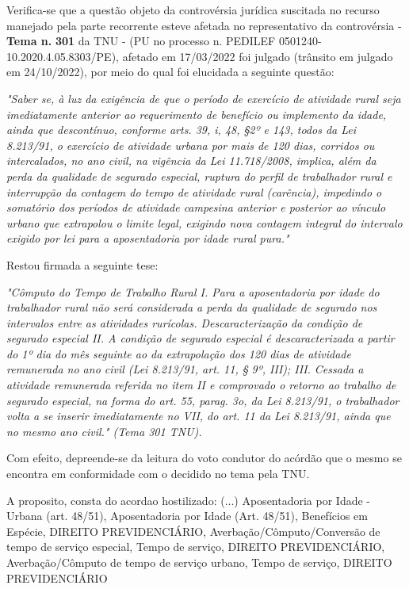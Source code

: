 \documentclass[12pt]{article}
\begin{document}
\justifying
\noindent Verifica-se que a questão objeto da controvérsia jurídica suscitada no recurso manejado pela parte recorrente esteve afetada no representativo da controvérsia - \textbf{Tema n. }\textbf{301} da TNU - (PU no processo n. PEDILEF 0501240-10.2020.4.05.8303/PE),  afetado em 17/03/2022 foi julgado (trânsito em julgado em 24/10/2022), por meio do qual foi elucidada a seguinte questão:

\noindent \textit{"Saber se, à luz da exigência de que o período de exercício de atividade rural seja imediatamente anterior ao requerimento de benefício ou implemento da idade, ainda que descontínuo, conforme arts. 39, i, 48, §2º e 143, todos da Lei 8.213/91, o exercício de atividade urbana por mais de 120 dias, corridos ou intercalados, no ano civil, na vigência da Lei 11.718/2008, implica, além da perda da qualidade de segurado especial, ruptura do perfil de trabalhador rural e interrupção da contagem do tempo de atividade rural (carência), impedindo o somatório dos períodos de atividade campesina anterior e posterior ao vínculo urbano que extrapolou o limite legal, exigindo nova contagem integral do intervalo exigido por lei para a aposentadoria por idade rural pura."}

\noindent Restou firmada a seguinte tese:

\noindent \textit{"Cômputo do Tempo de Trabalho Rural I. Para a aposentadoria por idade do trabalhador rural não será considerada a perda da qualidade de segurado nos intervalos entre as atividades rurícolas. Descaracterização da condição de segurado especial II. A condição de segurado especial é descaracterizada a partir do 1º dia do mês seguinte ao da extrapolação dos 120 dias de atividade remunerada no ano civil (Lei 8.213/91, art. 11, § 9º, III); III. Cessada a atividade remunerada referida no item II e comprovado o retorno ao trabalho de segurado especial, na forma do art. 55, parag. 3o, da Lei 8.213/91, o trabalhador volta a se inserir imediatamente no VII, do art. 11 da Lei 8.213/91, ainda que no mesmo ano civil." (Tema 301 TNU).}

\noindent Com efeito, depreende-se da leitura do voto condutor do acórdão que o mesmo se encontra em conformidade com o decidido no  tema pela TNU.

\noindent A proposito, consta do acordao hostilizado: (...) Aposentadoria por Idade - Urbana (art. 48/51), Aposentadoria por Idade (Art. 48/51), Benefícios em Espécie, DIREITO PREVIDENCIÁRIO, Averbação/Cômputo/Conversão de tempo de serviço especial, Tempo de serviço, DIREITO PREVIDENCIÁRIO, Averbação/Cômputo de tempo de serviço urbano, Tempo de serviço, DIREITO PREVIDENCIÁRIO
\end{document}
